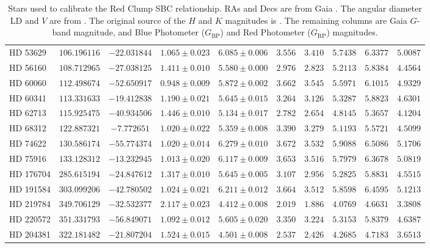 \documentclass[linenumbers,trackchanges]{aastex701}
\begin{document}
\begin{table}[htbp]
\begin{tabular}{lccccccccc}
HD 53629 & $106.196116$ & $-22.031844$ & $1.065 \pm 0.023$ & $6.085 \pm 0.006$ & $3.556$ & $3.410$ & $5.7438$ & $6.3377$ & $5.0087$ \\
HD 56160 & $108.712965$ & $-27.038125$ & $1.411 \pm 0.010$ & $5.580 \pm 0.000$ & $2.976$ & $2.823$ & $5.2113$ & $5.8384$ & $4.4564$ \\
HD 60060 & $112.498674$ & $-52.650917$ & $0.948 \pm 0.009$ & $5.872 \pm 0.002$ & $3.662$ & $3.545$ & $5.5971$ & $6.1015$ & $4.9329$ \\
HD 60341 & $113.331633$ & $-19.412838$ & $1.190 \pm 0.021$ & $5.645 \pm 0.015$ & $3.264$ & $3.126$ & $5.3287$ & $5.8823$ & $4.6301$ \\
HD 62713 & $115.925475$ & $-40.934506$ & $1.446 \pm 0.010$ & $5.134 \pm 0.017$ & $2.782$ & $2.654$ & $4.8145$ & $5.3657$ & $4.1204$ \\
HD 68312 & $122.887321$ & $-7.772651$ & $1.020 \pm 0.022$ & $5.359 \pm 0.008$ & $3.390$ & $3.279$ & $5.1193$ & $5.5721$ & $4.5099$ \\
HD 74622 & $130.586174$ & $-55.774374$ & $1.020 \pm 0.014$ & $6.279 \pm 0.010$ & $3.672$ & $3.532$ & $5.9088$ & $6.5086$ & $5.1706$ \\
HD 75916 & $133.128312$ & $-13.232945$ & $1.013 \pm 0.020$ & $6.117 \pm 0.009$ & $3.653$ & $3.516$ & $5.7979$ & $6.3678$ & $5.0819$ \\
HD 176704 & $285.615194$ & $-24.847612$ & $1.317 \pm 0.010$ & $5.645 \pm 0.005$ & $3.107$ & $2.956$ & $5.2825$ & $5.8831$ & $4.5515$ \\
HD 191584 & $303.099206$ & $-42.780502$ & $1.024 \pm 0.021$ & $6.211 \pm 0.012$ & $3.664$ & $3.512$ & $5.8598$ & $6.4595$ & $5.1213$ \\
HD 219784 & $349.706129$ & $-32.532377$ & $2.117 \pm 0.023$ & $4.412 \pm 0.008$ & $2.019$ & $1.886$ & $4.0769$ & $4.6631$ & $3.3808$ \\
HD 220572 & $351.331793$ & $-56.849071$ & $1.092 \pm 0.012$ & $5.605 \pm 0.020$ & $3.350$ & $3.224$ & $5.3153$ & $5.8379$ & $4.6387$ \\
HD 204381 & $322.181482$ & $-21.807204$ & $1.524 \pm 0.015$ & $4.501 \pm 0.008$ & $2.537$ & $2.426$ & $4.2685$ & $4.7183$ & $3.6513$ \\
\hline
\hline
\end{tabular}
\caption{Stars used to calibrate the Red Clump SBC relationship.  RAs and Decs are from Gaia \citep{2023A&A...674A...1G}.
The angular diameter LD and $V$ are
from \citet{2019Natur.567..200P}.  
The original source of the $H$ and $K$ magnitudes is \citet{2012MNRAS.419.1637L}.
The remaining columns are Gaia $G$-band magnitude, and Blue Photometer ($G_{\text{BP}}$) and 
    Red Photometer ($G_{\text{RP}}$)
    magnitudes.
\label{tab:extended_data_2}}

\end{table}
\end{document}
